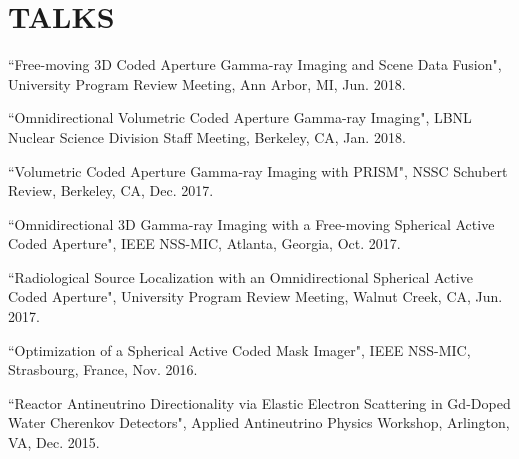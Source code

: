 \section{\small{TALKS}}

 \begin{thebibliography}{3}
 \raggedright
 \vspace{10pt}

 ``Free-moving 3D Coded Aperture Gamma-ray Imaging and Scene Data Fusion", University Program Review Meeting, Ann Arbor, MI, Jun. 2018.
 
 ``Omnidirectional Volumetric Coded Aperture Gamma-ray Imaging", LBNL Nuclear Science Division Staff Meeting, Berkeley, CA, Jan. 2018.

 ``Volumetric Coded Aperture Gamma-ray Imaging with PRISM", NSSC Schubert Review, Berkeley, CA, Dec. 2017.

 ``Omnidirectional 3D Gamma-ray Imaging with a Free-moving Spherical Active Coded Aperture", IEEE NSS-MIC, Atlanta, Georgia, Oct. 2017.
 
  ``Radiological Source Localization with an Omnidirectional Spherical Active Coded Aperture", University Program Review Meeting, Walnut Creek, CA, Jun. 2017.
 
  ``Optimization of a Spherical Active Coded Mask Imager", IEEE NSS-MIC, Strasbourg, France, Nov. 2016.

 ``Reactor Antineutrino Directionality via Elastic Electron Scattering in Gd-Doped Water Cherenkov Detectors", Applied Antineutrino Physics Workshop, Arlington, VA, Dec. 2015.

 \end{thebibliography}
